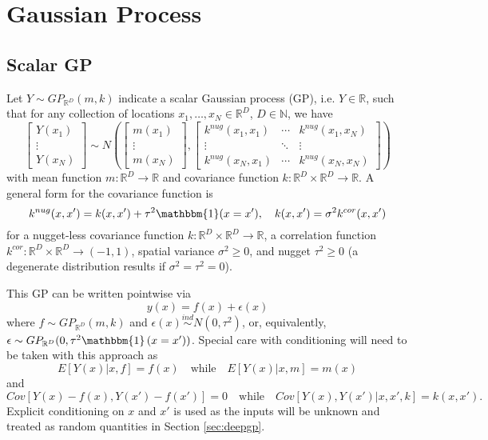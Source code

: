 \documentclass{article}
\newcommand{\ind}{\stackrel{ind}{\sim}}
\newcommand{\1}{\mathbbm{1}}
\newcommand{\nug}{nug}
\begin{document}
\section{Gaussian Process}

\subsection{Scalar GP}

Let $Y\sim GP_{\mathbb{R}^{D}}(m,k)$ indicate a scalar Gaussian process (GP),
i.e. $Y\in \mathbb{R}$,
such that for any collection of locations $x_1,\ldots,x_N \in \mathbb{R}^{D}$,
$D \in \mathbb{N}$,
we have
\[
\left[ \begin{array}{c} Y(x_1) \\ \vdots \\ Y(x_N) \end{array}  \right] \sim
N\left(\left[\begin{array}{c}
m(x_1) \\ \vdots \\ m(x_N)
\end{array} \right],
\left[ \begin{array}{ccc}
k^{\nug}(x_1,x_1) & \cdots & k^{\nug}(x_1,x_N) \\
\vdots & \ddots & \vdots \\
k^{\nug}(x_N,x_1) & \cdots & k^{\nug}(x_N,x_N)
\end{array} \right] \right)
\]
with mean function $m: \mathbb{R}^{D} \to \mathbb{R}$ and
covariance function $k: \mathbb{R}^{D}\times \mathbb{R}^{D} \to \mathbb{R}$.
A general form for the covariance function is
\[
k^{\nug}(x,x') = k(x,x') + \tau^2\1(x=x'), \quad
k(x,x')  = \sigma^2 k^{cor}(x,x')
\]
for a nugget-less covariance function
$k: \mathbb{R}^{D}\times \mathbb{R}^{D} \to \mathbb{R}$,
a correlation function
$k^{cor}: \mathbb{R}^{D}\times \mathbb{R}^{D} \to (-1,1)$,
spatial variance $\sigma^2\ge 0$, and nugget $\tau^2\ge 0$
(a degenerate distribution results if $\sigma^2=\tau^2=0$).

This GP can be written pointwise via
\[
y(x) = f(x) + \epsilon(x)
\]
where $f\sim GP_{\mathbb{R}^D}\left(m,k\right)$ and
$\epsilon(x) \ind N(0,\tau^2)$, or, equivalently,
$\epsilon \sim GP_{\mathbb{R}^D}(0,\tau^2\1\left(x=x')\right)$.
Special care with conditioning will need to be taken with this approach as
\[
E[Y(x)|x,f] = f(x) \quad \mbox{while} \quad E[Y(x)|x,m] = m(x)
\]
and
\[
Cov[Y(x)-f(x),Y(x')-f(x')] = 0
\quad \mbox{while} \quad
Cov[Y(x),Y(x')|x,x',k] = k(x,x').
\]
Explicit conditioning on $x$ and $x'$ is used as the inputs will be unknown
and treated as random quantities in Section \ref{sec:deepgp}.
\end{document}
